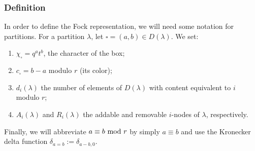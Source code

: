\documentclass{amsart}
\theoremstyle{remark}
\numberwithin{thm}{section}
\numberwithin{equation}{section}
\begin{document}
\subsubsection{Definition}
In order to define the Fock representation, we will need some notation for partitions.
For a partition $\lambda$, let $\square=(a,b)\in D(\lambda)$.
We set:
\begin{enumerate}
\item $\chi_\square=q^{a}t^{b}$, the character of the box;
\item $c_\square= b-a$ modulo $r$ (its color);
\item $d_i(\lambda)$ the number of elements of $D(\lambda)$ with content equivalent to $i$ modulo $r$;
\item $A_i(\lambda)$ and $R_i(\lambda)$ the addable and removable $i$-nodes of $\lambda$, respectively.
\end{enumerate}
Finally, we will abbreviate $a\equiv b\hbox{ mod }r$ by simply $a\equiv b$ and use the Kronecker delta function $\delta_{a= b}:=\delta_{a-b,0}$.
\end{document}
